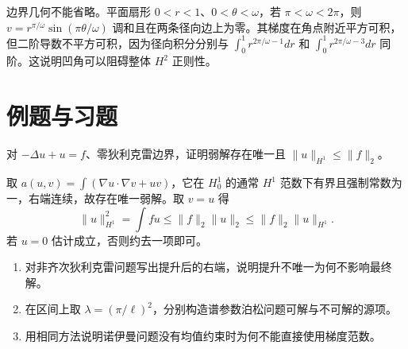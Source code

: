 边界几何不能省略。平面扇形 $0<r<1$、$0<\theta<\omega$，若 $\pi<\omega<2\pi$，则 $v=r^{\pi/\omega}\sin(\pi\theta/\omega)$ 调和且在两条径向边上为零。其梯度在角点附近平方可积，但二阶导数不平方可积，因为径向积分分别与 $\int_0^1r^{2\pi/\omega-1}dr$ 和 $\int_0^1r^{2\pi/\omega-3}dr$ 同阶。这说明凹角可以阻碍整体 $H^2$ 正则性。

\section{例题与习题}
\begin{example}
对 $-\Delta u+u=f$、零狄利克雷边界，证明弱解存在唯一且 $\|u\|_{H^1}\le\|f\|_2$。
\end{example}
\begin{solve}
取 $a(u,v)=\int(\nabla u\cdot\nabla v+uv)$，它在 $H_0^1$ 的通常 $H^1$ 范数下有界且强制常数为一，右端连续，故存在唯一弱解。取 $v=u$ 得
\[
 \|u\|_{H^1}^2=\int fu\le\|f\|_2\|u\|_2\le\|f\|_2\|u\|_{H^1}.
\]
若 $u=0$ 估计成立，否则约去一项即可。
\end{solve}
\begin{enumerate}
 \item 对非齐次狄利克雷问题写出提升后的右端，说明提升不唯一为何不影响最终解。
 \item 在区间上取 $\lambda=(\pi/\ell)^2$，分别构造谱参数泊松问题可解与不可解的源项。
 \item 用相同方法说明诺伊曼问题没有均值约束时为何不能直接使用梯度范数。
\end{enumerate}

